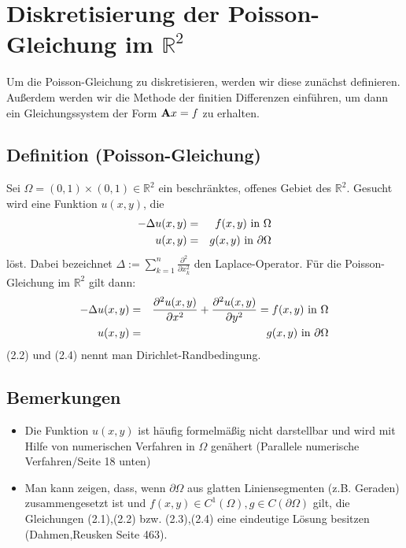 \chapter{Diskretisierung der Poisson-Gleichung im $\mathbb{R}^{2}$}\label{c.Diskretisierte Poisson-Gleichung}
Um die Poisson-Gleichung zu diskretisieren, werden wir diese zunächst definieren. Außerdem werden wir die Methode der finitien Differenzen einführen, um dann ein Gleichungssystem der Form ${\textbf{A}}x = f$ zu erhalten.

\section{Definition (Poisson-Gleichung)}\label{s.Poisson-Gleichung}

Sei $\Omega = (0,1)\times(0,1) \in \mathbb{R}^{2}$ ein beschränktes, offenes Gebiet des $\mathbb{R}^{2}$. Gesucht wird eine Funktion $u(x,y)$, die
\begin{eqnarray}
	-\Delta u(x,y) &=& f(x,y) \textnormal{ in } \Omega \\
    u(x,y) &=& g(x,y) \textnormal{ in } \partial \Omega
\end{eqnarray}
löst.
Dabei bezeichnet $\Delta := \sum\limits_{k=1}^{n} \frac {\partial^{2}} {\partial x_{k}^{2}}$ den Laplace-Operator. Für die Poisson-Gleichung im $\mathbb{R}^{2}$ gilt dann:
\begin{eqnarray}
	-\Delta u(x,y) &=& \frac {\partial^{2} u(x,y)} {\partial x^{2}} + \frac {\partial^{2} u(x,y)} {\partial y^{2}} = f(x,y) \textnormal{ in } \Omega \\
    u(x,y) &=& g(x,y) \textnormal{ in } \partial \Omega
\end{eqnarray}
(2.2) und (2.4) nennt man Dirichlet-Randbedingung.

\section{Bemerkungen}\label{s.Bemerkungen zur Poisson-Gleichung}

\begin{itemize}
\item Die Funktion $u(x,y)$ ist häufig formelmäßig nicht darstellbar und wird mit Hilfe von numerischen Verfahren in $\Omega$ genähert (Parallele numerische Verfahren/Seite 18 unten)
\item Man kann zeigen, dass, wenn $\partial \Omega$ aus glatten Liniensegmenten (z.B. Geraden) zusammengesetzt ist und $f(x,y) \in C^{1}(\Omega), g \in C(\partial \Omega)$ gilt, die Gleichungen (2.1),(2.2) bzw. (2.3),(2.4) eine eindeutige Lösung besitzen (Dahmen,Reusken Seite 463).
\end{itemize}

